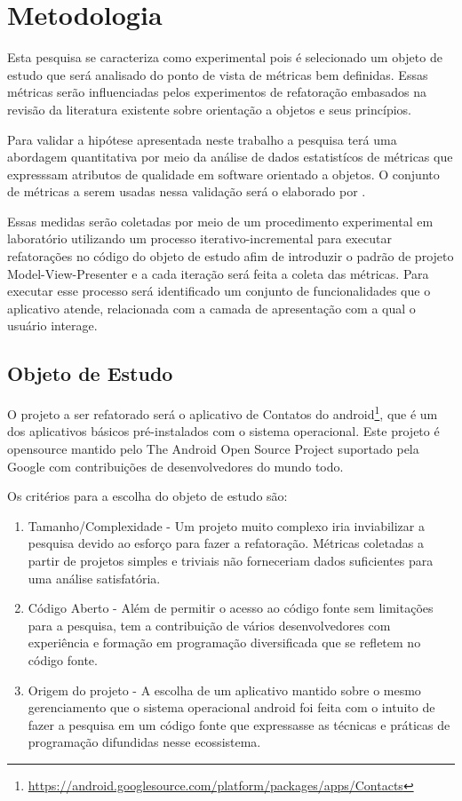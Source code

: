 \documentclass[conference]{IEEEtran}
\begin{document}
\section{Metodologia}

Esta pesquisa se caracteriza como experimental pois é selecionado um objeto
de estudo que será analisado do ponto de vista de métricas bem definidas. Essas
métricas serão influenciadas pelos experimentos de refatoração embasados na
revisão da literatura existente sobre orientação a objetos e seus princípios.

Para validar a hipótese apresentada neste trabalho a pesquisa terá uma
abordagem quantitativa por meio da análise de dados estatistícos de métricas 
que expresssam atributos de qualidade em software orientado a objetos. O
conjunto de métricas a serem usadas nessa validação será o elaborado por
\cite{cksuite}.

Essas medidas serão coletadas por meio de um procedimento experimental em
laboratório utilizando um processo iterativo-incremental para executar
refatorações no código do objeto de estudo afim de introduzir o padrão de
projeto Model-View-Presenter e a cada iteração será feita a coleta das
métricas. Para executar esse processo será identificado um conjunto de
funcionalidades que o aplicativo atende, relacionada com a camada de
apresentação com a qual o usuário interage.

\subsection{Objeto de Estudo}


O projeto a ser refatorado será o aplicativo de Contatos do
android\footnote{\url{https://android.googlesource.com/platform/packages/apps/Contacts}},
que é um dos aplicativos básicos pré-instalados com o sistema operacional. Este
projeto é opensource mantido pelo  The Android Open Source Project suportado
pela Google com contribuições de desenvolvedores do mundo todo.

Os critérios para a escolha do objeto de estudo são:

\begin{enumerate}
  \item Tamanho/Complexidade - Um projeto muito complexo iria inviabilizar a
  pesquisa devido ao esforço para fazer a refatoração. Métricas coletadas
  a partir de projetos simples e triviais não forneceriam dados suficientes para
  uma análise satisfatória.
  \item Código Aberto - Além de permitir o acesso ao código fonte sem
  limitações para a pesquisa, tem a contribuição de vários desenvolvedores com
  experiência e formação em programação diversificada que se refletem no código fonte.
  \item Origem do projeto - A escolha de um aplicativo mantido sobre o mesmo
  gerenciamento que o sistema operacional android foi feita com o intuito de
  fazer a pesquisa em um código fonte que expressasse as técnicas e práticas de
  programação difundidas nesse ecossistema.
\end{enumerate}
\end{document}

